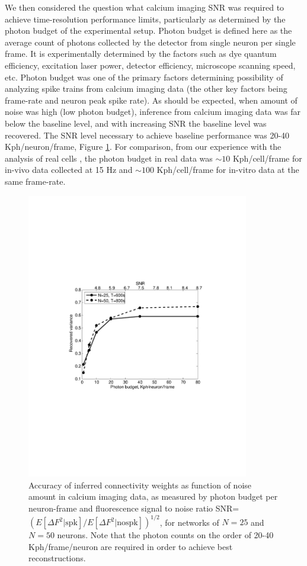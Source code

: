 We then considered the question what calcium imaging SNR was required to achieve time-resolution performance limits, particularly as determined by the photon budget of the experimental setup. Photon budget is defined here as the average count of photons collected by the detector from single neuron per single frame. It is experimentally determined by the factors such as dye quantum efficiency, excitation laser power, detector efficiency, microscope scanning speed, etc. Photon budget was one of the primary factors determining possibility of analyzing spike trains from calcium imaging data (the other key factors being frame-rate and neuron peak spike rate).  As should be expected, when amount of noise was high (low photon budget), inference from calcium imaging data was far below the baseline level, and with increasing SNR the baseline level was recovered. The SNR level necessary to achieve baseline performance was 20-40 Kph/neuron/frame, Figure \ref{fig:ca-noise}.  For comparison, from our experience with the analysis of real cells \cite{Vogelstein2009}, the photon budget in real data was $\sim 10$ Kph/cell/frame for in-vivo data collected at 15 Hz and $\sim 100$ Kph/cell/frame for in-vitro data at the same frame-rate.

\begin{figure}
\includegraphics[width=275pt]{../figs/Figure3_perf_vs_gamma}
\caption{Accuracy of inferred connectivity weights as function of noise amount in
calcium imaging data, as measured by photon budget per neuron-frame and fluorescence
signal to noise ratio
SNR=$\left({E[\Delta F^2 | \text{spk}]}/{E[\Delta F^2|\text{nospk}]}\right)^{1/2}$, 
for networks of $N=25$ and $N=50$ neurons. Note that the photon counts on the order of 20-40 Kph/frame/neuron are required in order to achieve best reconstructions.}
\label{fig:ca-noise}
\end{figure}

